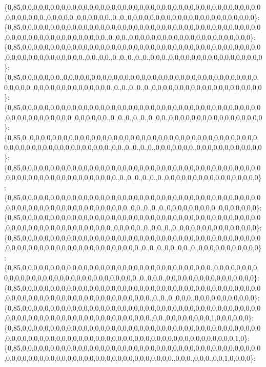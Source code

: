\{0,85,0,0,0,0,0,0,0,0,0,0,0,0,0,0,0,0,0,0,0,0,0,0,0,0,0,0,0,0,0,0,0,0,0,0,0,0,0,0,0,0,0,0,0,0,0,0,0,0,0,0.,0,0,0,0,0.,0,0,0,0,0,0.,0.,0.,0,0,0,0,0,0,0,0,0,0,0,0,0,0,0,0,0,0,0,0,0,0,0\}\+: \{0,85,0,0,0,0,0,0,0,0,0,0,0,0,0,0,0,0,0,0,0,0,0,0,0,0,0,0,0,0,0,0,0,0,0,0,0,0,0,0,0,0,0,0,0,0,0,0,0,0,0,0,0,0,0,0,0,0,0,0,0,0,0.,0.,0,0.,0,0,0,0,0,0,0,0,0,0,0,0,0,0,0,0,0,0,0,0,0,0\}\+: \{0,85,0,0,0,0,0,0,0,0,0,0,0,0,0,0,0,0,0,0,0,0,0,0,0,0,0,0,0,0,0,0,0,0,0,0,0,0,0,0,0,0,0,0,0,0,0,0,0,0,0,0,0,0,0,0,0,0,0.,0,0.,0,0.,0.,0.,0.,0.,0.,0,0,0.,0,0,0,0,0,0,0,0,0,0,0,0,0,0,0,0,0\}\+: \{0,85,0,0,0,0,0,0,0.,0,0,0,0,0,0,0,0,0,0,0,0,0,0,0,0,0,0,0,0,0,0,0,0,0,0,0,0,0,0,0,0,0,0,0,0,0,0,0,0.,0,0,0,0,0,0,0,0,0,0,0,0,0,0.,0.,0.,0.,0.,0.,0,0,0,0,0,0,0,0,0,0,0,0,0,0,0,0,0,0,0,0\}\+: \{0,85,0,0,0,0,0,0,0,0,0,0,0,0,0,0,0,0,0,0,0,0,0,0,0,0,0,0,0,0,0,0,0,0,0,0,0,0,0,0,0,0,0,0,0,0,0,0,0,0,0,0,0,0,0,0,0.,0,0,0,0,0,0.,0.,0.,0.,0.,0.,0.,0,0.,0,0,0,0,0,0,0,0,0,0,0,0,0,0,0,0,0\}\+: \{0,85,0.,0,0,0,0,0,0,0,0,0,0,0,0,0,0,0,0,0,0,0,0,0,0,0,0,0,0,0,0,0,0,0,0,0,0,0,0,0,0,0,0,0,0,0,0,0,0,0,0,0,0,0,0,0,0,0,0,0,0,0,0.,0,0.,0.,0.,0.,0.,0,0,0,0,0,0,0.,0,0,0,0,0,0,0,0,0,0,0,0\}\+: \{0,85,0,0,0,0,0,0,0,0,0,0,0,0,0,0,0,0,0,0,0,0,0,0,0,0,0,0,0,0,0,0,0,0,0,0,0,0,0,0,0,0,0,0,0,0,0,0,0,0,0,0,0,0,0,0,0,0,0,0,0,0,0,0,0.,0.,0.,0.,0.,0.,0.,0,0,0,0,0,0,0,0,0,0,0,0,0,0,0,0,0\}\+: \{0,85,0,0,0,0,0,0,0,0,0,0,0,0,0,0,0,0,0,0,0,0,0,0,0,0,0,0,0,0,0,0,0,0,0,0,0,0,0,0,0,0,0,0,0,0,0,0,0,0,0,0,0,0,0,0,0,0,0,0,0,0,0,0,0,0,0.,0,0.,0.,0.,0.,0,0,0,0,0,0,0,0,0.,0,0,0,0,0,0,0\}\+: \{0,85,0,0,0,0,0,0,0,0,0,0,0,0,0,0,0,0,0,0,0,0,0,0,0,0,0,0,0,0,0,0,0,0,0,0,0,0,0,0,0,0,0,0,0,0,0,0,0,0,0,0,0,0,0,0,0,0,0,0,0,0,0,0.,0,0,0,0,0.,0.,0,0.,0.,0.,0,0,0,0,0,0,0,0,0,0,0,0,0,0\}\+: \{0,85,0,0,0,0,0,0,0,0,0,0,0,0,0,0,0,0,0,0,0,0,0,0,0,0,0,0,0,0,0,0,0,0,0,0,0,0,0,0,0,0,0,0,0,0,0,0,0,0,0,0,0,0,0,0,0,0,0,0,0,0,0,0,0,0,0,0,0.,0.,0.,0.,0,0.,0,0.,0.,0,0,0,0,0,0,0,0,0,0,0\}\+: \{0,85,0,0,0,0,0,0,0,0,0,0,0,0,0,0,0,0,0,0,0,0,0,0,0,0,0,0,0,0,0,0,0,0,0,0.,0,0,0,0,0,0,0,0,0,0,0,0,0,0,0,0,0,0,0,0,0,0,0,0,0,0,0,0,0,0,0,0.,0.,0,0,0.,0,0,0,0,0,0,0,0,0,0,0,0,0,0,0,0\}\+: \{0,85,0,0,0,0,0,0,0,0,0,0,0,0,0,0,0,0,0,0,0,0,0,0,0,0,0,0,0,0,0,0,0,0,0,0,0,0,0,0,0,0,0,0,0,0,0,0,0,0,0,0,0,0,0,0,0,0,0,0,0,0,0,0,0,0,0,0,0,0,0.,0.,0.,0.,0,0,0.,0,0,0,0,0,0,0,0,0,0,0\}\+: \{0,85,0,0,0,0,0,0,0,0,0,0,0,0,0,0,0,0,0,0,0,0,0,0,0,0,0,0,0,0,0,0,0,0,0,0,0,0,0,0,0,0,0,0,0,0,0,0,0,0,0,0,0,0,0,0,0,0,0,0,0,0,0,0,0,0,0,0,0,0,0.,0,0.,0,0,0,0,0,0,0,0,1,0,0,0,0,0,0\}\+: \{0,85,0,0,0,0,0,0,0,0,0,0,0,0,0,0,0,0,0,0,0,0,0,0,0,0,0,0,0,0,0,0,0,0,0,0,0,0,0,0,0,0,0,0,0,0,0,0,0,0,0,0,0,0,0,0,0,0,0,0,0,0,0,0,0,0,0,0,0,0,0,0,0,0,0,0,0,0,0,0,0,0,0,0,0,0,1,0\}\+: \{0,85,0,0,0,0,0,0,0,0,0,0,0,0,0,0,0,0,0,0,0,0,0,0,0,0,0,0,0,0,0,0,0,0,0,0,0,0,0,0,0,0,0,0,0,0,0,0,0,0,0,0,0,0,0,0,0,0,0,0,0,0,0,0,0,0,0,0,0,0,0,0,0,0,0.,0,0,0.,0,0,0.,0,0,1,0,0,0,0\}\+: 